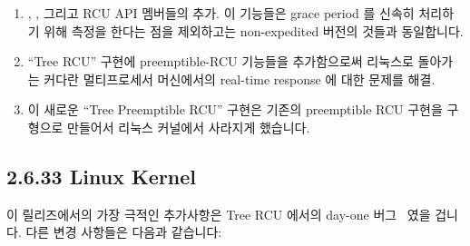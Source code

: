 \begin{enumerate}
\item	{}, ,
	그리고  RCU API 멤버들의 추가.
	이 기능들은 grace period 를 신속히 처리하기 위해 측정을 한다는 점을
	제외하고는 non-expedited 버전의 것들과 동일합니다.
\item	``Tree RCU'' 구현에 preemptible-RCU 기능들을 추가함으로써 리눅스로
	돌아가는 커다란 멀티프로세서 머신에서의 real-time response 에 대한
	문제를 해결.
\item	이 새로운 ``Tree Preemptible RCU'' 구현은 기존의 preemptible RCU 구현을
	구형으로 만들어서 리눅스 커널에서 사라지게 했습니다.

\end{enumerate}

\subsection{2.6.33 Linux Kernel}

이 릴리즈에서의 가장 극적인 추가사항은 Tree RCU 에서의 day-one
버그~\cite{PaulEMcKenney2009HuntingHeisenbugs} 였을 겁니다.
다른 변경 사항들은 다음과 같습니다:


